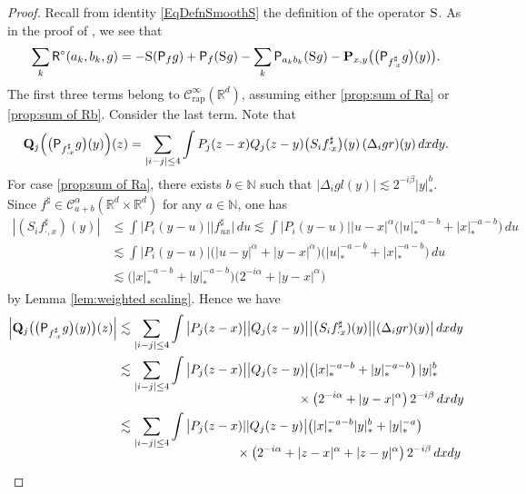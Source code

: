 \documentclass[10pt]{amsart}
\theoremstyle{plain}
\theoremstyle{definition}
\newcommand{\rap}{\mathrm{rap}}
\newcommand{\bfP}{\mathbf{P}}
\newcommand{\bfQ}{\mathbf{Q}}
\newcommand{\sfP}{\mathsf{P}}
\newcommand{\sfR}{\mathsf{R}}
\newcommand{\bbN}{\mathbb{N}}
\newcommand{\bbR}{\mathbb{R}}
\newcommand{\mcC}{\mathcal{C}}
\begin{document}
\begin{proof}
Recall from identity \eqref{EqDefnSmoothS} the definition of the operator $\textsc{S}$. As in the proof of \cite[Prop.\,10]{BH}, we see that
\begin{align*}
\sum_k \sfR^\circ(a_k,b_k,g) = -\textsc{S}(\sfP_fg) + \sfP_f(\textsc{S} g) - \sum_k\sfP_{a_kb_k}(\textsc{S} g) - \bfP_{x,y}\bigl(\bigl(\sfP_{f_{\cdot x}^\sharp}g\bigr)(y)\bigr).
\end{align*}
The first three terms belong to $\mcC_\rap^\infty(\bbR^d)$, assuming either \eqref{prop:sum of Ra} or \eqref{prop:sum of Rb}. Consider the last term. Note that
\begin{align*}
\bfQ_j\Bigl(\bigl(\sfP_{f_{\cdot x}^\sharp}g\bigr)(y)\Bigr)(z) = \sum_{|i-j|\le4}\int P_j(z-x)Q_j(z-y) \bigl(S_if_{\cdot x}^\sharp\bigr)(y) \,(\Delta_igr)(y)\,dxdy.
\end{align*}
For case \eqref{prop:sum of Ra}, there exists $b\!\in\!\bbN$ such that $|\Delta_igl(y)|\!\lesssim\!2^{-i\beta}|y|_*^b$. Since \hbox{$f^\sharp\!\in\!\mcC_{a+b}^\alpha(\bbR^d\!\times\!\bbR^d)$} for any $a\in\bbN$, one has
\begin{align*}
|(S_if_{\cdot,x}^\sharp)(y)|
&\le\int \big|P_i(y-u)\big| \big|f_{ux}^\sharp\big|\,du
\lesssim \int \big|P_i(y-u)\big| |u-x|^\alpha \bigl(|u|_*^{-a-b}+|x|_*^{-a-b}\bigr)\,du \\
&\lesssim \int \big|P_i(y-u)\big| \bigl(|u-y|^\alpha+|y-x|^\alpha\bigr)\bigl(|u|_*^{-a-b}+|x|_*^{-a-b}\bigr)\,du \\
&\lesssim \bigl(|x|_*^{-a-b}+|y|_*^{-a-b}\bigr)\bigl(2^{-i\alpha}+|y-x|^\alpha\bigr)
\end{align*}
by Lemma \ref{lem:weighted scaling}. Hence we have
\begin{align*}
\Big|\bfQ_j\bigl(\bigl(\sfP_{f_{\cdot x}^\sharp}g\bigr)(y)\bigr)(z)\Big| &\lesssim \sum_{|i-j|\le4}\int \big|P_j(z-x)\big|\big|Q_j(z-y)\big| \big| \bigl(S_if_{\cdot x}^\sharp)(y)\big| \big|(\Delta_igr)(y)\big|\,dxdy \\
&\lesssim \sum_{|i-j|\le4}\int \big|P_j(z-x)\big| \big|Q_j(z-y)\big| \bigl(|x|_*^{-a-b} + |y|_*^{-a-b}\bigr)\,|y|_*^b\\[-5pt]
&\hspace*{5cm}\times\bigl(2^{-i\alpha}+|y-x|^\alpha\bigr)\,2^{-i\beta}\,dxdy \\
&\lesssim\sum_{|i-j|\le4}\int \big|P_j(z-x)||Q_j(z-y)\big| \bigl(|x|_*^{-a-b}|y|_*^b + |y|_*^{-a}\bigr)\\[-7pt]
&\hspace*{3.3cm}\times\bigl(2^{-i\alpha}+|z-x|^\alpha+|z-y|^\alpha\bigr)\,2^{-i\beta}\,dxdy \\[2pt]

\end{align*}
\end{proof}
\end{document}
